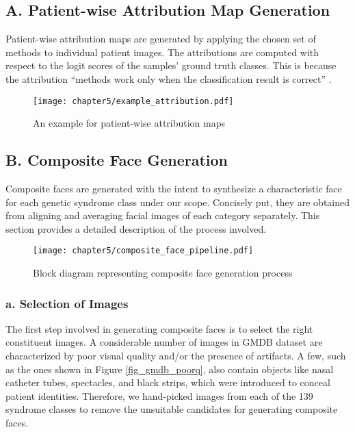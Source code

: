 \documentclass[../report.tex]{subfiles}
\begin{document}
    \subsection{A. Patient-wise Attribution Map Generation}
        \noindent
    Patient-wise attribution maps are generated by applying the chosen set of methods to individual patient images. The attributions are computed with respect to the logit scores of the samples' ground truth classes. This is because the attribution \enquote{methods work only when the classification result is correct} \cite{muhammad2020eigen}.
    \begin{figure}[H]
    	\hspace*{0cm}      
    	\texttt{[image: chapter5/example\_attribution.pdf]}
    	\caption{An example for patient-wise attribution maps}
    	\label{fig_gm_pipeline}
    \end{figure}
    \subsection{B. Composite Face Generation}\label{sec_cface_gen}
        \noindent
    Composite faces are generated with the intent to synthesize a characteristic face for each genetic syndrome class under our scope. Concisely put, they are obtained from aligning and averaging facial images of each category separately. This section provides a detailed description of the process involved.
       \begin{figure}[H]
    	\hspace*{-0.5cm}      
    	\texttt{[image: chapter5/composite\_face\_pipeline.pdf]}
    	\caption{Block diagram representing composite face generation process}
    	\label{fig_gm_pipeline}
    \end{figure}
    
    \subsubsection{a. Selection of Images}
    The first step involved in generating composite faces is to select the right constituent images. A considerable number of images in GMDB dataset are characterized by poor visual quality and/or the presence of artifacts. A few, such as the ones shown in Figure \ref{fig_gmdb_poorq}, also contain objects like nasal catheter tubes, spectacles, and black strips, which were introduced to conceal patient identities. Therefore, we hand-picked images from each of the 139 syndrome classes to remove the unsuitable candidates for generating composite faces.
    
\end{document}

